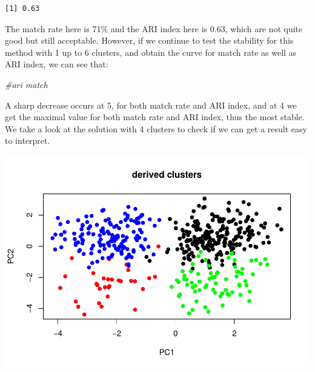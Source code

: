 \documentclass[
  11pt,
]{article}
\newenvironment{Shaded}{\begin{snugshade}}{\end{snugshade}}
\newcommand{\AttributeTok}[1]{\textcolor[rgb]{0.77,0.63,0.00}{#1}}
\newcommand{\CommentTok}[1]{\textcolor[rgb]{0.56,0.35,0.01}{\textit{#1}}}
\newcommand{\DecValTok}[1]{\textcolor[rgb]{0.00,0.00,0.81}{#1}}
\newcommand{\FunctionTok}[1]{\textcolor[rgb]{0.00,0.00,0.00}{#1}}
\newcommand{\NormalTok}[1]{#1}
\newcommand{\SpecialCharTok}[1]{\textcolor[rgb]{0.00,0.00,0.00}{#1}}
\newcommand{\StringTok}[1]{\textcolor[rgb]{0.31,0.60,0.02}{#1}}
\begin{document}
\begin{verbatim}
[1] 0.63
\end{verbatim}

The match rate here is 71\% and the ARI index here is 0.63, which are not quite good but still acceptable. However, if we continue to test the stability for this method with 1 up to 6 clusters, and obtain the curve for match rate as well as ARI index, we can see that:

\begin{Shaded}
\begin{Highlighting}[]
\CommentTok{\#ari match}
\end{Highlighting}
\end{Shaded}

A sharp decrease occurs at 5, for both match rate and ARI index, and at 4 we get the maximal value for both match rate and ARI index, thus the most stable. We take a look at the solution with 4 clusters to check if we can get a result easy to interpret.

\begin{Shaded}
\end{Shaded}

\includegraphics{report_files/figure-latex/Task_3_104-1.pdf}
\end{document}
